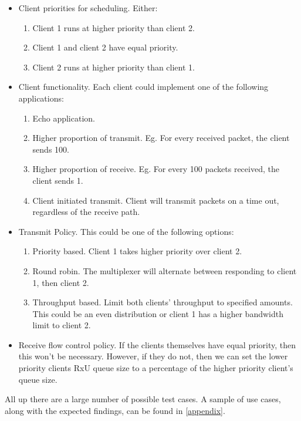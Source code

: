 \begin{itemize}
    \item Client priorities for scheduling. Either:
        \begin{enumerate}
            \item Client 1 runs at higher priority than client 2.
            \item Client 1 and client 2 have equal priority.
            \item Client 2 runs at higher priority than client 1.
        \end{enumerate}
    \item Client functionality. Each client could implement one of the following applications:
        \begin{enumerate}
            \item Echo application.
            \item Higher proportion of transmit. Eg. For every received packet, the client sends 100.
            \item Higher proportion of receive. Eg. For every 100 packets received, the client sends 1.
            \item Client initiated transmit. Client will transmit packets on a time out, regardless of the receive path. 
        \end{enumerate}
    \item Transmit Policy. This could be one of the following options:
        \begin{enumerate}
            \item Priority based. Client 1 takes higher priority over client 2. 
            \item Round robin. The multiplexer will alternate between responding to client 1, then client 2.
            \item Throughput based. Limit both clients' throughput to specified amounts. This could be 
            an even distribution or client 1 has a higher bandwidth limit to client 2.
        \end{enumerate}
    \item Receive flow control policy. If the clients themselves have equal priority, then this won't be necessary. 
    However, if they do not, then we can set the lower priority clients RxU queue size to a percentage of the
    higher priority client's queue size.
\end{itemize}

All up there are a large number of possible test cases. A sample of use cases, along with the
expected findings, can be found in \autoref{appendix}.

